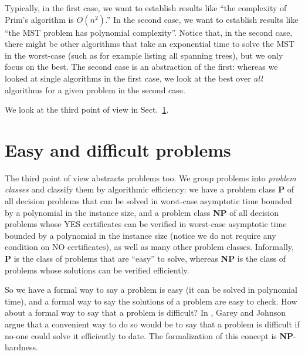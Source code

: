 \documentclass[a4paper]{book}
\theoremstyle{changebreak}                %
\begin{document}
Typically, in the first case, we want to establish results like ``the
complexity of Prim's
algorithm is $O(n^2)$.''  In the second case,
we want to establish results like ``the MST
problem has polynomial
complexity''. Notice that, in the second
case, there might be other algorithms that take an exponential time to
solve the MST in the worst-case (such as for example listing all
spanning trees), but we only focus on the best. The second case is an
abstraction of the first: whereas we looked at
single algorithms in the first case, we look at the best over {\it
  all} algorithms for a given problem in the second case.

We look at the third point of view in Sect.~\ref{s:problem:class}.

\section{Easy and difficult problems}
\label{s:problem:class}
The third point of view abstracts problems too. We group problems into
{\it problem classes} and classify them by
algorithmic efficiency: we have a
problem class {\bf P} of all decision problems that can
be solved in worst-case asymptotic time bounded by a
polynomial in the instance
size, and a problem class {\bf NP} of all decision problems whose YES
certificates can be verified in worst-case
asymptotic time bounded by a polynomial in the instance size (notice
we do not require any condition on NO
certificates), as well as many other problem
classes. Informally, {\bf P} is the class of problems that are
``easy'' to solve, whereas {\bf NP} is the class of problems whose
solutions can be verified efficiently. 

So we have a formal way to say a problem is easy (it can be solved in
polynomial time), and a formal way to say the solutions of a problem
are easy to check. How about a formal way to say that a problem is
difficult? In \cite{gareyjohnson}, Garey and Johnson argue that a convenient way to do so would be
to say that a problem is difficult if no-one could solve it
efficiently to date. The formalization of this concept is {\bf
  NP}-hardness.
\end{document}
